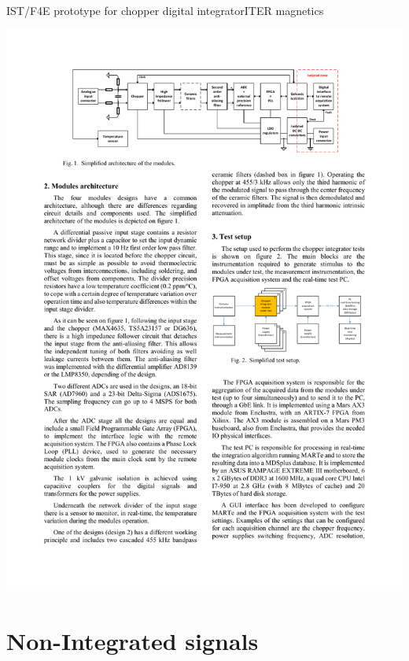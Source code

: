 \documentclass{beamer}
\begin{document}
\begin{frame}{IST/F4E prototype for chopper digital integrator}{ITER magnetics}
	\begin{center}
		\includegraphics[width=\columnwidth]{F4Integrator}

	\end{center}
\end{frame}



\section{Non-Integrated signals}

\end{document}
